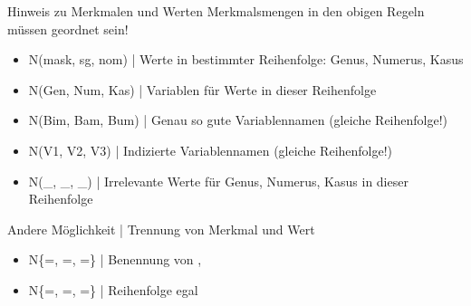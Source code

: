 \begin{frame}
  {Hinweis zu Merkmalen und Werten}
  \onslide<+->
  \onslide<+->
  Merkmalsmengen in den obigen Regeln müssen geordnet sein!\\
  \Halbzeile
  \begin{itemize}[<+->]
    \item N(mask, sg, nom) | \alert{Werte} in \alert{bestimmter Reihenfolge}: Genus, Numerus, Kasus
    \item N(Gen, Num, Kas) | \alert{Variablen} für Werte in dieser Reihenfolge
    \item N(Bim, Bam, Bum) | Genau so gute \alert{Variablennamen} (gleiche Reihenfolge!)
    \item N(V1, V2, V3) | \alert{Indizierte Variablennamen} (gleiche Reihenfolge!)
    \item N(\_, \_, \_) | Irrelevante Werte für Genus, Numerus, Kasus \alert{in dieser Reihenfolge}
  \end{itemize}
  \onslide<+->
  \Zeile
  Andere Möglichkeit | Trennung von Merkmal und Wert\\
  \Halbzeile
  \begin{itemize}[<+->]
    \item N\{=, =, =\} | Benennung von , 
    \item N\{=, =, =\} | Reihenfolge egal
  \end{itemize}
\end{frame}

